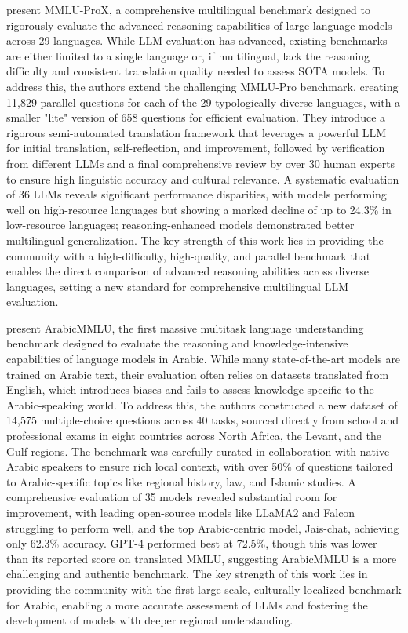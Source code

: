 \documentclass[acmsmall]{acmart}
\begin{document}
\citep{xuan2025mmlu} present MMLU-ProX, a comprehensive multilingual benchmark designed to rigorously evaluate the advanced reasoning capabilities of large language models across 29 languages. While LLM evaluation has advanced, existing benchmarks are either limited to a single language or, if multilingual, lack the reasoning difficulty and consistent translation quality needed to assess SOTA models. To address this, the authors extend the challenging MMLU-Pro benchmark, creating 11,829 parallel questions for each of the 29 typologically diverse languages, with a smaller "lite" version of 658 questions for efficient evaluation. They introduce a rigorous semi-automated translation framework that leverages a powerful LLM for initial translation, self-reflection, and improvement, followed by verification from different LLMs and a final comprehensive review by over 30 human experts to ensure high linguistic accuracy and cultural relevance. A systematic evaluation of 36 LLMs reveals significant performance disparities, with models performing well on high-resource languages but showing a marked decline of up to 24.3\% in low-resource languages; reasoning-enhanced models demonstrated better multilingual generalization. The key strength of this work lies in providing the community with a high-difficulty, high-quality, and parallel benchmark that enables the direct comparison of advanced reasoning abilities across diverse languages, setting a new standard for comprehensive multilingual LLM evaluation.

\citep{koto2024arabicmmlu} present ArabicMMLU, the first massive multitask language understanding benchmark designed to evaluate the reasoning and knowledge-intensive capabilities of language models in Arabic. While many state-of-the-art models are trained on Arabic text, their evaluation often relies on datasets translated from English, which introduces biases and fails to assess knowledge specific to the Arabic-speaking world. To address this, the authors constructed a new dataset of 14,575 multiple-choice questions across 40 tasks, sourced directly from school and professional exams in eight countries across North Africa, the Levant, and the Gulf regions. The benchmark was carefully curated in collaboration with native Arabic speakers to ensure rich local context, with over 50\% of questions tailored to Arabic-specific topics like regional history, law, and Islamic studies. A comprehensive evaluation of 35 models revealed substantial room for improvement, with leading open-source models like LLaMA2 and Falcon struggling to perform well, and the top Arabic-centric model, Jais-chat, achieving only 62.3\% accuracy. GPT-4 performed best at 72.5\%, though this was lower than its reported score on translated MMLU, suggesting ArabicMMLU is a more challenging and authentic benchmark. The key strength of this work lies in providing the community with the first large-scale, culturally-localized benchmark for Arabic, enabling a more accurate assessment of LLMs and fostering the development of models with deeper regional understanding.
\end{document}
